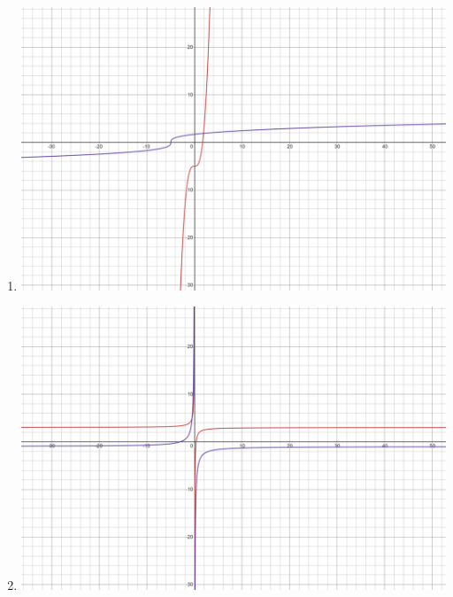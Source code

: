 \documentclass{ximera}
\begin{document}
\begin{exercise}
\begin{enumerate}
\begin{image}
\end{image}
\item
\begin{image}
\includegraphics[width=.7\textwidth]{IFR7d.png}
\end{image}
\item
\begin{image}
\includegraphics[width=.7\textwidth]{IFR7e.png}
\end{image}
\end{enumerate}
\begin{selectAll}

\end{selectAll}
\end{exercise}
\end{document}
